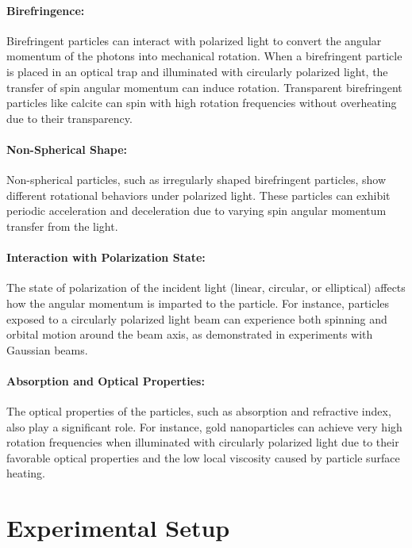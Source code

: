 \documentclass[12pt,english]{scrartcl}
\begin{document}
\paragraph{Birefringence:}
Birefringent particles can interact with polarized light to convert the angular
momentum of the photons into mechanical rotation. When a birefringent particle
is placed in an optical trap and illuminated with circularly polarized light,
the transfer of spin angular momentum can induce rotation. Transparent
birefringent particles like calcite can spin with high rotation frequencies
without overheating due to their
transparency.\cite{frieseOpticalAlignmentSpinning1998}

\paragraph{Non-Spherical Shape:}
Non-spherical particles, such as irregularly shaped birefringent particles,
show different rotational behaviors under polarized light. These particles can
exhibit periodic acceleration and deceleration due to varying spin angular
momentum transfer from the light.\cite{rothmayerIrregularSpinAngular2009}

\paragraph{Interaction with Polarization State:}
The state of polarization of the incident light (linear, circular, or
elliptical) affects how the angular momentum is imparted to the particle. For
instance, particles exposed to a circularly polarized light beam can experience
both spinning and orbital motion around the beam axis, as demonstrated in
experiments with Gaussian beams. \cite{angelskyCircularMotionParticles2012}

\paragraph{Absorption and Optical Properties:}
The optical properties of the particles, such as absorption and refractive
index, also play a significant role. For instance, gold nanoparticles can
achieve very high rotation frequencies when illuminated with circularly
polarized light due to their favorable optical properties and the low local
viscosity caused by particle surface heating.
\cite{lehmuskeroUltrafastSpinningGold2013}

\section{Experimental Setup}\label{sec:versuchsanordnung}
\end{document}
